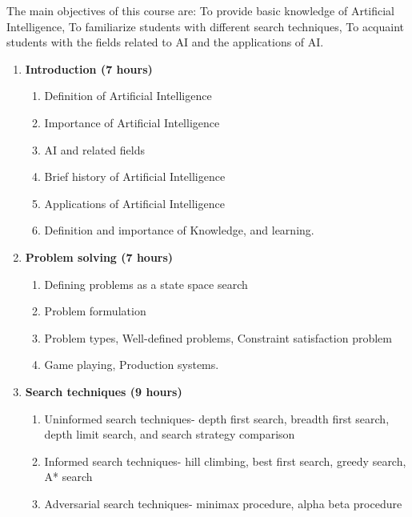 
\cobjectives
  The main objectives of this course are: To provide basic knowledge of Artificial Intelligence, To familiarize students with different search techniques, To acquaint students with the fields related to AI and the applications of AI.
  \VS

\begin{enumerate}
  \item \textbf{Introduction \hfill (7 hours)}
    \begin{enumerate}
      \item Definition of Artificial Intelligence
      \item Importance of Artificial Intelligence
      \item AI and related fields
      \item Brief history of Artificial Intelligence
      \item Applications of Artificial Intelligence
      \item Definition and importance of Knowledge, and learning.
    \end{enumerate}
    \vs

  \item \textbf{Problem solving \hfill (7 hours)}
    \begin{enumerate}
      \item Defining problems as a state space search
      \item Problem formulation
      \item Problem types, Well-defined problems, Constraint satisfaction problem
      \item Game playing, Production systems.
    \end{enumerate}
    \vs

  \item \textbf{Search techniques \hfill (9 hours)}
    \begin{enumerate}
      \item Uninformed search techniques- depth first search, breadth first search, depth limit search, and search strategy comparison
      \item Informed search techniques- hill climbing, best first search, greedy search, A* search
      \item Adversarial search techniques- minimax procedure, alpha beta procedure
    \end{enumerate}
    \vs


\end{enumerate}
